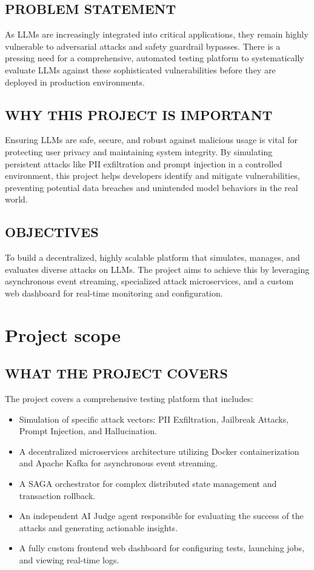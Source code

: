 \documentclass[12pt,a4paper]{article}
\begin{document}
\subsection*{PROBLEM STATEMENT}
As LLMs are increasingly integrated into critical applications, they remain highly vulnerable to adversarial attacks and safety guardrail bypasses. There is a pressing need for a comprehensive, automated testing platform to systematically evaluate LLMs against these sophisticated vulnerabilities before they are deployed in production environments.

\subsection*{WHY THIS PROJECT IS IMPORTANT}
Ensuring LLMs are safe, secure, and robust against malicious usage is vital for protecting user privacy and maintaining system integrity. By simulating persistent attacks like PII exfiltration and prompt injection in a controlled environment, this project helps developers identify and mitigate vulnerabilities, preventing potential data breaches and unintended model behaviors in the real world.

\subsection*{OBJECTIVES}
To build a decentralized, highly scalable platform that simulates, manages, and evaluates diverse attacks on LLMs. The project aims to achieve this by leveraging asynchronous event streaming, specialized attack microservices, and a custom web dashboard for real-time monitoring and configuration.

\section*{Project scope}

\subsection*{WHAT THE PROJECT COVERS}
The project covers a comprehensive testing platform that includes:
\begin{itemize}
    \item Simulation of specific attack vectors: PII Exfiltration, Jailbreak Attacks, Prompt Injection, and Hallucination.
    \item A decentralized microservices architecture utilizing Docker containerization and Apache Kafka for asynchronous event streaming.
    \item A SAGA orchestrator for complex distributed state management and transaction rollback.
    \item An independent AI Judge agent responsible for evaluating the success of the attacks and generating actionable insights.
    \item A fully custom frontend web dashboard for configuring tests, launching jobs, and viewing real-time logs.
\end{itemize}
\end{document}
